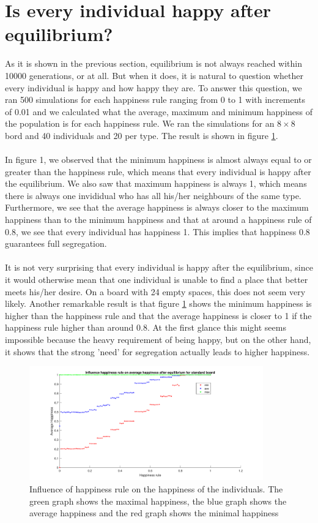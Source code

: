 
\section{Is every individual happy after equilibrium?}
As it is shown in the previous section, equilibrium is not always reached within 10000 generations, or at all. 
But when it does, it is natural to question whether every individual is happy and how happy they are. 
To answer this question, we ran 500 simulations for each happiness rule ranging from 0 to 1 with increments of 0.01 and we calculated what the average, maximum and minimum happiness of the population is for each happiness rule. 
We ran the simulations for an $8\times 8$ bord and 40 individuals and 20 per type. 
The result is shown in figure \ref{happyhappy}.\\
\\
In figure 1, we observed that the minimum happiness is almost always equal to or greater than the happiness rule, which means that every individual is happy after the equilibrium. 
We also saw that maximum happiness is always 1, which means there is always one invididual who has all his/her neighbours of the same type. 
Furthermore, we see that the average happiness is always closer to the maximum happiness than to the minimum happiness and that at around a happiness rule of 0.8, we see that every individual has happiness 1. 
This implies that happiness 0.8 guarantees full segregation.\\
\\
It is not very surprising that every individual is happy after the equilibrium, since it would otherwise mean that one individual is unable to find a place that better meets his/her desire. 
On a board with 24 empty spaces, this does not seem very likely. 
Another remarkable result is that figure \ref{happyhappy} shows the minimum happiness is higher than the happiness rule and that the average happiness is closer to 1 if the happiness rule higher than around 0.8. 
At the first glance this might seems impossible because the heavy requirement of being happy, but on the other hand, it shows that the strong 'need' for segregation actually leads to higher happiness.
\begin{figure}[h!]
    \centering
    \includegraphics[width=0.9\textwidth]{happinessregel-gemhappinesseind-2}
    \caption{Influence of happiness rule on the happiness of the individuals. The green graph shows the maximal happiness, the blue graph shows the average happiness and the red graph shows the minimal happiness}
    \label{happyhappy}
\end{figure}
